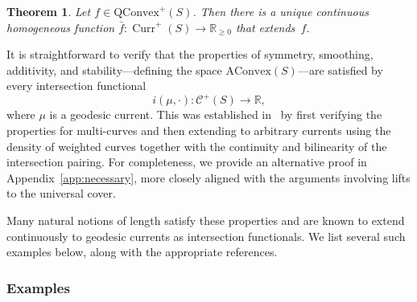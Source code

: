 \documentclass[11pt]{amsart}
\numberwithin{equation}{section}
\numberwithin{figure}{section}
\newtheorem{theorem}{Theorem}[section]
\theoremstyle{definition}
\theoremstyle{plain}
\newcommand\bbR{\ensuremath{\mathbb{R}}}
\DeclareMathOperator{\Curr}{Curr}
\newcommand{\AConvex}{\mathrm{AConvex}}
\newcommand{\QConvex}{\mathrm{QConvex}}
\newcommand{\Curves}{\mathcal{C}}
\begin{document}
\begin{theorem}{\cite[Theorem~A]{MGT21:Smoothings}}\label{thm:convex}
   Let $f \in \QConvex^+(S)$. Then there is a unique continuous homogeneous function
  $\bar{f} \colon \Curr^+(S) \to \bbR_{\ge 0}$ that extends~$f$.
\end{theorem}

It is straightforward to verify that the properties of symmetry,
smoothing, additivity, and stability---defining the space
$\AConvex(S)$---are satisfied by every intersection functional
\[
i(\mu,\cdot) \colon \Curves^+(S) \to \mathbb{R},
\]
where $\mu$ is a geodesic current. This was established
in~\cite[Section~4]{MGT21:Smoothings} by first verifying the
properties for multi-curves and then extending to arbitrary currents
using the density of weighted curves together with the continuity and
bilinearity of the intersection pairing.
For completeness, we provide an alternative proof in
Appendix~\ref{app:necessary}, more closely aligned with the arguments
involving lifts to the universal cover.

Many natural notions of length satisfy these properties and are known
to extend continuously to geodesic currents as intersection
functionals. We list several such examples below, along with the
appropriate references.

\subsubsection{Examples}
\end{document}

